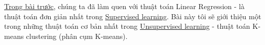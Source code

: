 \href{http://machinelearningcoban.com/2016/12/28/linearregression/}{Trong bài trước}, chúng ta đã làm quen với thuật toán Linear Regression - là thuật toán đơn giản nhất trong \href{http://machinelearningcoban.com/2016/12/27/categories/#supervised-learning-hoc-co-giam-sat}{Supervised learning}. Bài này tôi sẽ giới thiệu một trong những thuật toán cơ bản nhất trong \href{http://machinelearningcoban.com/2016/12/27/categories/#unsupervised-learning-hoc-khong-giam-sat}{Unsupervised learning} - thuật toán K-means clustering (phân cụm K-means).  
 
